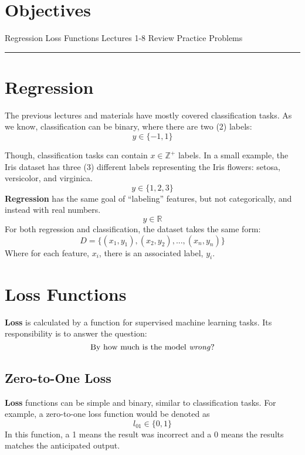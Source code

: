 \usepackage{tikz} %
\section*{Objectives}
\begin{outline}
    \1 Regression
    \1 Loss Functions
    \1 Lectures 1-8 Review
    \1 Practice Problems
\end{outline}

\rule[0.0051in]{\textwidth}{0.00025in}


\section{Regression}
The previous lectures and materials have mostly covered classification tasks. As we know, classification can be binary, where there are two (2) labels: 
\[
y \in \{-1, 1\}
\]

Though, classification tasks can contain $x\mathbb{\in Z^+}$ labels. In a small example, the Iris dataset has three (3) different labels representing the Iris flowers: setosa, versicolor, and virginica.
\[
y \in \{1, 2, 3\}
\]
\textbf{Regression} has the same goal of ``labeling'' features, but not categorically, and instead with real numbers.
\[
y \in \mathbb{R}
\]
For both regression and classification, the dataset takes the same form:
\[
D = \{(x_1, y_1), (x_2, y_2),...,(x_n, y_n)\}
\]
Where for each feature, $x_i$, there is an associated label, $y_i$.
\section{Loss Functions}
\textbf{Loss} is calculated by a function for supervised machine learning tasks. Its responsibility is to answer the question: 
\[
\text{By how much is the model \textit{wrong}?}
\]

\subsection{Zero-to-One Loss}
\textbf{Loss} functions can be simple and binary, similar to classification tasks. For example, a zero-to-one loss function would be denoted as
\[
l_{01} \in \{0, 1\}
\]
In this function, a 1 means the result was incorrect and a 0 means the results matches the anticipated output.

